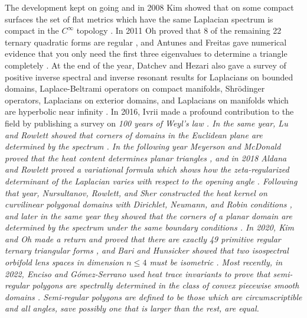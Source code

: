 \documentclass{amsart}
\theoremstyle{definition}
\begin{document}
The development kept on going and in 2008 Kim showed that on some compact surfaces the set of flat metrics which have the same Laplacian spectrum is compact in the $C^\infty$ topology \cite{kim2008surfaces}. In 2011 Oh proved that 8 of the remaining 22 ternary quadratic forms are regular \cite{oh2011regular}, and Antunes and Freitas gave numerical evidence that you only need the first three eigenvalues to determine a triangle completely \cite{antunes2011inverse}. At the end of the year, Datchev and Hezari also gave a survey of positive inverse spectral and inverse resonant results for Laplacians on bounded domains, Laplace-Beltrami operators on compact manifolds, Shrödinger operators, Laplacians on exterior domains, and Laplacians on manifolds which are hyperbolic near infinity \cite{datchev2011inverse}.  In 2016, Ivrii made a profound contribution to the field by publishing a survey on \em 100 years of Weyl's law \em \cite{ivrii2016100}.   In the same year, Lu and Rowlett showed that corners of domains in the Euclidean plane are determined by the spectrum \cite{lu2016one}. In the following year Meyerson and McDonald proved that the heat content determines planar triangles \cite{meyerson2017heat}, and in 2018 Aldana and Rowlett proved a variational formula which shows how the zeta-regularized determinant of the Laplacian varies with respect to the opening angle \cite{aldana2018polyakov}. Following that year, Nursultanov, Rowlett, and Sher constructed the heat kernel on curvilinear polygonal domains with Dirichlet, Neumann, and Robin conditions \cite{nursultanov2019heat}, and later in the same year they showed that the corners of a planar domain are determined by the spectrum under the same boundary conditions \cite{nursultanov2019hear}. In 2020, Kim and Oh made a return and proved that there are exactly 49 primitive regular ternary triangular forms \cite{kim2020regular}, and Bari and Hunsicker showed that two isospectral orbifold lens spaces in dimension $n \leq 4$ must be isometric \cite{bari2020isospectrality}. Most recently, in 2022, Enciso and G\'omez-Serrano used heat trace invariants to prove that semi-regular polygons are spectrally determined in the class of convex piecewise smooth domains \cite{semiregular_polygons}.  Semi-regular polygons are defined to be those which are circumscriptible and all angles, save possibly one that is larger than the rest, are equal.  
\end{document}
